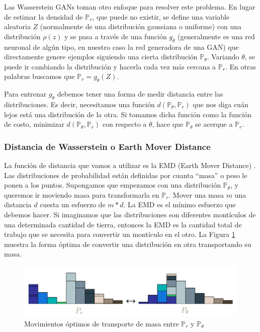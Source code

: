 \documentclass[spanish]{report}
\begin{document}
Las Wasserstein GANs \cite{wgan_paper} toman otro enfoque para resolver este problema. En lugar de estimar la densidad de $\mathbb{P}_{r}$, que puede no existir, se define una variable aleatoria $Z$ (normalmente de una distribución gaussiana o uniforme) con una distribución $\rho(z)$ y se pasa a través de una función  $g_{\theta}$ (generalmente es una red neuronal de algún tipo, en nuestro caso la red generadora de una GAN) que directamente genere ejemplos siguiendo una cierta distribución $\mathbb{P}_{\theta}$. Variando $\theta$, se puede ir cambiando la distribución y hacerla cada vez más cercana a $\mathbb{P}_{r}$. En otras palabras buscamos que $\mathbb{P}_{r} = g_{\theta}(Z)$.

Para entrenar $g_{\theta}$ debemos tener una forma de medir distancia entre las distribuciones. Es decir, necesitamos una función $d(\mathbb{P}_{\theta}, \mathbb{P}_{r})$ que nos diga cuán lejos está una distribución de la otra. Si tomamos dicha función como la función de costo, minimizar $d(\mathbb{P}_{\theta}, \mathbb{P}_{r})$ con respecto a $\theta$, hace que $\mathbb{P}_{\theta}$ se acerque a $\mathbb{P}_{r}$.


\subsubsection{Distancia de Wasserstein o Earth Mover Distance}

La función de distancia que vamos a utilizar es la EMD (Earth Mover Distance) \cite{earth_move_distance}. Las distribuciones de probabilidad están definidas por cuanta ``masa'' o peso le ponen a los puntos. Supongamos que empezamos con una distribución $\mathbb{P}_{\theta}$, y queremos ir moviendo masa para transformarla en $\mathbb{P}_{r}$. Mover una masa $m$ una distancia $d$ cuesta un esfuerzo de $m * d$. La EMD es el mínimo esfuerzo que debemos hacer. Si imaginamos que las distribuciones son diferentes montículos de una determinada cantidad de tierra, entonces la EMD es la cantidad total de trabajo que se necesita para convertir un montículo en el otro. La Figura \ref{fig:emd} muestra la forma óptima de convertir una distribución en otra transportando su masa.


\begin{figure}[h]
\centering
 \includegraphics[width=\linewidth]{earth_move.png}
   \caption[Movimientos óptimos de transporte de masa entre $\mathbb{P}_{r}$ y $\mathbb{P}_{\theta}$]{Movimientos óptimos de transporte de masa entre $\mathbb{P}_{r}$ y $\mathbb{P}_{\theta}$ \protect\footnotemark}
  \label{fig:emd}
\end{figure}
\end{document}
